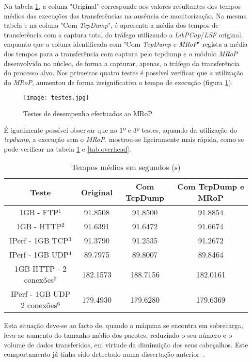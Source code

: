 Na tabela \ref{tab:desempenho}, a coluna "Original" corresponde aos valores resultantes dos tempos médios das execuções das transferências na ausência de monitorização.
Na mesma tabela e na coluna "Com \textit{TcpDump}", é apresenta a média dos tempos de transferência com a captura total do tráfego utilizando a \textit{LibPCap}/\textit{LSF} original, enquanto que a coluna identificada com "Com \textit{TcpDump} e \textit{MRoP}" regista a média dos tempos para a transferência com captura pelo tcpdump e o módulo \textit{MRoP} desenvolvido no núcleo, de forma a capturar, apenas, o tráfego da transferência do processo alvo.
Nos primeiros quatro testes é possível verificar que a utilização do \textit{MRoP}, aumentou de forma insignificativa o tempo de execução (figura \ref{fig:tests_graphics}).

\begin{figure}[!htbp]
\centering
\texttt{[image: testes.jpg]}
\caption{Testes de desempenho efectuados ao MRoP}
\label{fig:tests_graphics}
\end{figure}

É igualmente possível observar que no 1º e 3º testes, aquando da utilização do \textit{tcpdump}, a execução sem o \textit{MRoP}, mostrou-se ligeiramente mais rápida, como se pode verificar na tabela \ref{tab:desempenho} e \ref{tab:overhead}.
\begin{table}[!htb]
\begin{center}
\caption{Tempos médios em segundos (s)}
\begin{tabular}{ | c | c | c | c |  }
\hline
Teste & \hspace {0.3cm} Original \hspace {0.3cm}& \hspace {0.2cm} Com TcpDump \hspace {0.2cm} & Com TcpDump e MRoP \\
\hline
1GB - FTP$^{1}$ & 91.8508	& 91.8500 & 91.8854 \\
1GB - HTTP$^{2}$ & 91.6391 & 91.6472 & 91.6674 \\ 
IPerf - 1GB TCP$^{3}$ & 91.3790	& 91.2535	& 91.2672 \\
IPerf - 1GB UDP$^{4}$ & 89.7975 & 89.8007 & 89.8464 \\
\hline
\hline
1GB HTTP - 2 conexões$^{5}$ & 182.1573 & 188.7156 & 182.0161 \\
IPerf - 1GB UDP 2 conexões$^{6}$ & 179.4930 & 179.6280 & 179.6369 \\
\hline
\end{tabular}
\label{tab:desempenho}
\end{center}
\end{table}
Esta situação deve-se ao facto de, quando a máquina se encontra em sobrecarga, leva ao aumento do tamanho médio dos pacotes, reduzindo o seu número e o volume de dados transferidos, em virtude da diminuição dos seus cabeçalhos.
Este comportamento já tinha sido detectado numa dissertação anterior~\cite{Farruca:2009}.

